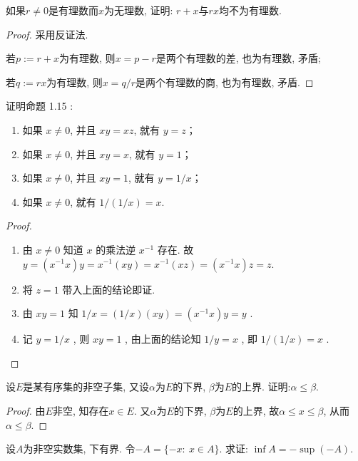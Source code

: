 \documentclass{article}
\begin{document}
\begin{problem}[1-1]
如果$ r\neq 0 $是有理数而$ x $为无理数, 证明: $ r+x $与$ rx $均不为有理数.
\end{problem}

\begin{proof}
采用反证法. \par 
若$ p:=r+x $为有理数, 则$ x=p-r $是两个有理数的差, 也为有理数, 矛盾; \par 
若$ q:=rx $为有理数, 则$ x=q/r $是两个有理数的商, 也为有理数, 矛盾.
\end{proof}

\begin{problem}[1-3]
证明命题 1.15 : 
\begin{enumerate}[label=(\alph*)]
\item 如果 \(x \neq 0\), 并且 \(xy = xz\), 就有 \(y = z\)；
\item 如果 \(x \neq 0\), 并且 \(xy = x\), 就有 \(y = 1\)；
\item 如果 \(x \neq 0\), 并且 \(xy = 1\), 就有 \(y = 1/x\)；
\item 如果 \(x \neq 0\), 就有 \(1/(1/x) = x\). 
\end{enumerate}
\end{problem}

\begin{proof}
\begin{enumerate}[label=(\alph*)]
\item 由 $ x\neq 0 $ 知道 $ x $ 的乘法逆 $ x^{-1} $ 存在. 故 $ y=(x^{-1}x)y=x^{-1}(xy)=x^{-1}(xz)=(x^{-1}x)z=z $. 
\item 将 $ z=1 $ 带入上面的结论即证.
\item 由 $ xy=1 $ 知 $ 1/x=(1/x)(xy)=(x^{-1}x)y=y $ .
\item 记 $ y=1/x $ , 则 $ xy=1 $ , 由上面的结论知 $ 1/y=x $ , 即 $ 1/(1/x)=x $ .
\end{enumerate}
\end{proof}

\begin{problem}[1-4]
设$ E $是某有序集的非空子集, 又设$ \alpha $为$ E $的下界, $ \beta $为$ E $的上界. 证明:$ \alpha\le\beta $.
\end{problem}

\begin{proof}
由$ E $非空, 知存在$ x\in E $. 又$ \alpha $为$ E $的下界, $ \beta $为$ E $的上界, 故$ \alpha\le x\le\beta $, 从而$ \alpha\le\beta $.
\end{proof}

\begin{problem}[1-5]
设$ A $为非空实数集, 下有界. 令$ -A=\{-x:\ x\in A\} $. 求证: $ \inf A=-\sup(-A) $.
\end{problem}
\end{document}
